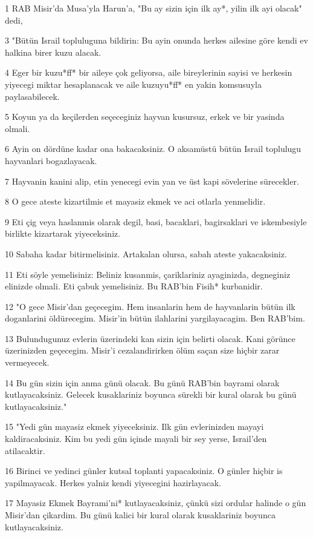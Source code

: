 \par 1 RAB Misir'da Musa'yla Harun'a, "Bu ay sizin için ilk ay*, yilin ilk ayi olacak" dedi,
\par 3 "Bütün Israil topluluguna bildirin: Bu ayin onunda herkes ailesine göre kendi ev halkina birer kuzu alacak.
\par 4 Eger bir kuzu*ff* bir aileye çok geliyorsa, aile bireylerinin sayisi ve herkesin yiyecegi miktar hesaplanacak ve aile kuzuyu*ff* en yakin komsusuyla paylasabilecek.
\par 5 Koyun ya da keçilerden seçeceginiz hayvan kusursuz, erkek ve bir yasinda olmali.
\par 6 Ayin on dördüne kadar ona bakacaksiniz. O aksamüstü bütün Israil toplulugu hayvanlari bogazlayacak.
\par 7 Hayvanin kanini alip, etin yenecegi evin yan ve üst kapi sövelerine sürecekler.
\par 8 O gece ateste kizartilmis et mayasiz ekmek ve aci otlarla yenmelidir.
\par 9 Eti çig veya haslanmis olarak degil, basi, bacaklari, bagirsaklari ve iskembesiyle birlikte kizartarak yiyeceksiniz.
\par 10 Sabaha kadar bitirmelisiniz. Artakalan olursa, sabah ateste yakacaksiniz.
\par 11 Eti söyle yemelisiniz: Beliniz kusanmis, çariklariniz ayaginizda, degneginiz elinizde olmali. Eti çabuk yemelisiniz. Bu RAB'bin Fisih* kurbanidir.
\par 12 "O gece Misir'dan geçecegim. Hem insanlarin hem de hayvanlarin bütün ilk doganlarini öldürecegim. Misir'in bütün ilahlarini yargilayacagim. Ben RAB'bim.
\par 13 Bulundugunuz evlerin üzerindeki kan sizin için belirti olacak. Kani görünce üzerinizden geçecegim. Misir'i cezalandirirken ölüm saçan size hiçbir zarar vermeyecek.
\par 14 Bu gün sizin için anma günü olacak. Bu günü RAB'bin bayrami olarak kutlayacaksiniz. Gelecek kusaklariniz boyunca sürekli bir kural olarak bu günü kutlayacaksiniz."
\par 15 "Yedi gün mayasiz ekmek yiyeceksiniz. Ilk gün evlerinizden mayayi kaldiracaksiniz. Kim bu yedi gün içinde mayali bir sey yerse, Israil'den atilacaktir.
\par 16 Birinci ve yedinci günler kutsal toplanti yapacaksiniz. O günler hiçbir is yapilmayacak. Herkes yalniz kendi yiyecegini hazirlayacak.
\par 17 Mayasiz Ekmek Bayrami'ni* kutlayacaksiniz, çünkü sizi ordular halinde o gün Misir'dan çikardim. Bu günü kalici bir kural olarak kusaklariniz boyunca kutlayacaksiniz.
